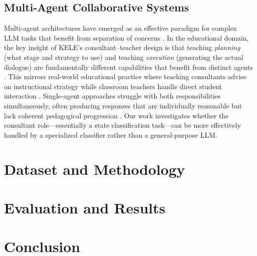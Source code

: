 \documentclass[11pt]{article}
\begin{document}
\subsection{Multi-Agent Collaborative Systems}

Multi-agent architectures have emerged as an effective paradigm for complex LLM tasks that benefit from separation of concerns \citep{ge2023openagi}. In the educational domain, the key insight of KELE's consultant--teacher design is that teaching \emph{planning} (what stage and strategy to use) and teaching \emph{execution} (generating the actual dialogue) are fundamentally different capabilities that benefit from distinct agents \citep{peng2025kele}. This mirrors real-world educational practice where teaching consultants advise on instructional strategy while classroom teachers handle direct student interaction \citep{nevin2009collaborative}. Single-agent approaches struggle with both responsibilities simultaneously, often producing responses that are individually reasonable but lack coherent pedagogical progression \citep{an2024llmcontext}. Our work investigates whether the consultant role---essentially a state classification task---can be more effectively handled by a specialized classifier rather than a general-purpose LLM.

\section{Dataset and Methodology}


\section{Evaluation and Results}


\section{Conclusion}
\end{document}
